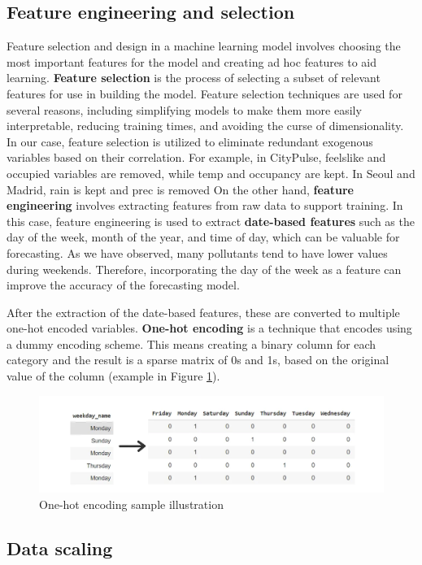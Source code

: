\subsection{Feature engineering and selection}
Feature selection and design in a machine learning model involves choosing the most important features for the model and creating ad hoc features to aid learning. 
\textbf{Feature selection} is the process of selecting a subset of relevant features for use in building the model.
Feature selection techniques are used for several reasons, including simplifying models to make them more easily interpretable, reducing training times, and avoiding the curse of dimensionality.
In our case, feature selection is utilized to eliminate redundant exogenous variables based on their correlation.
For example, in CityPulse, feelslike and occupied variables are removed, while temp and occupancy are kept. In Seoul and Madrid, rain is kept and prec is removed
On the other hand, \textbf{feature engineering} involves extracting features from raw data to support training.
In this case, feature engineering is used to extract \textbf{date-based features} such as the day of the week, month of the year, and time of day, which can be valuable for forecasting. As we have observed, many pollutants tend to have lower values during weekends. Therefore, incorporating the day of the week as a feature can improve the accuracy of the forecasting model.


After the extraction of the date-based features, these are converted to multiple one-hot encoded variables. \textbf{One-hot encoding} is a technique that encodes using a dummy encoding scheme. This means creating a binary column for each category and the result is a sparse matrix of 0s and 1s, based on the original value of the column (example in Figure \ref{fig:one-hot}).
\begin{figure}
    \centering
    \includegraphics[width=0.75\linewidth]{images/onehotencoding.png}
    \caption{One-hot encoding sample illustration \cite{onehotencoding}}
    \label{fig:one-hot}
\end{figure}

\subsection{Data scaling}

